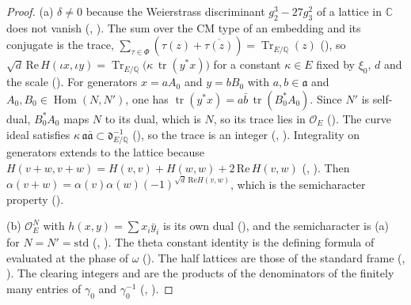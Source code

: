 \documentclass[11pt]{article}
\newcommand{\OEr}{\mathcal O_E}
\newcommand{\Tr}{\operatorname{Tr}}
\newcommand{\tr}{\operatorname{tr}}
\newcommand{\Hom}{\operatorname{Hom}}
\theoremstyle{remark}
\begin{document}
\begin{proof}
(a) $\delta\neq0$ because the Weierstrass discriminant $g_2^3-27g_3^2$ of a lattice in $\mathbb C$ does not vanish (, ). The sum over the CM type of an embedding and its conjugate is the trace, $\sum_{\tau\in\Phi}(\tau(z)+\overline{\tau(z)})=\Tr_{E/\mathbb Q}(z)$ (), so $\sqrt d\,\mathrm{Re}\,H(\iota x,\iota y)=\Tr_{E/\mathbb Q}\bigl(\kappa\,\tr(y^*x)\bigr)$ for a constant $\kappa\in E$ fixed by $\xi_0$, $d$ and the scale (). For generators $x=aA_0$ and $y=bB_0$ with $a,b\in\mathfrak a$ and $A_0,B_0\in\Hom(N,N')$, one has $\tr(y^*x)=a\bar b\,\tr(B_0^*A_0)$. Since $N'$ is self-dual, $B_0^*A_0$ maps $N$ to its dual, which is $N$, so its trace lies in $\OEr$ (). The curve ideal satisfies $\kappa\,\mathfrak a\bar{\mathfrak a}\subset\mathfrak d^{-1}_{E/\mathbb Q}$ (), so the trace is an integer (, ). Integrality on generators extends to the lattice because $H(v+w,v+w)=H(v,v)+H(w,w)+2\,\mathrm{Re}\,H(v,w)$ (, ). Then $\alpha(v+w)=\alpha(v)\alpha(w)(-1)^{\sqrt d\,\mathrm{Re}H(v,w)}$, which is the semicharacter property ().

(b) $\OEr^N$ with $h(x,y)=\sum x_i\bar y_i$ is its own dual (), and the semicharacter is (a) for $N=N'=\mathrm{std}$ (, ). The theta constant identity  is the defining formula of  evaluated at the phase of $\omega$ (). The half lattices are those of the standard frame (, ). The clearing integers  and  are the products of the denominators of the finitely many entries of $\gamma_0$ and $\gamma_0^{-1}$ (, ).


\end{proof}
\end{document}
